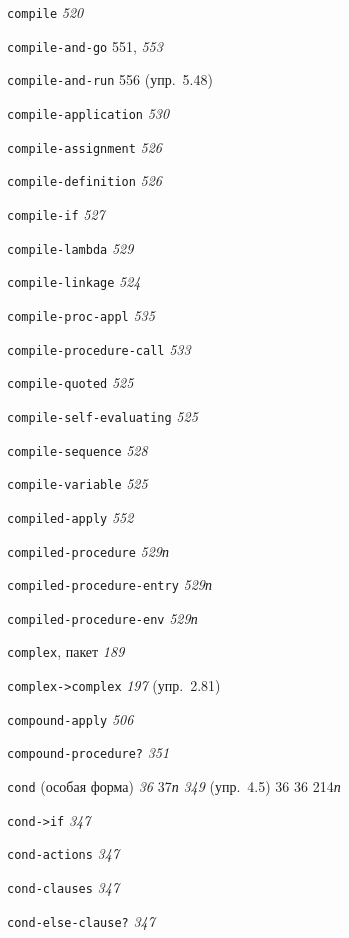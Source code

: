 \begin{theindex}
\item {\texttt{compile}} {\it 520}
\item {\texttt{compile-and-go}} 551, {\it 553}
\item {\texttt{compile-and-run}} 556 (упр.~5.48)
\item {\texttt{compile-application}} {\it 530}
\item {\texttt{compile-assignment}} {\it 526}
\item {\texttt{compile-definition}} {\it 526}
\item {\texttt{compile-if}} {\it 527}
\item {\texttt{compile-lambda}} {\it 529}
\item {\texttt{compile-linkage}} {\it 524}
\item {\texttt{compile-proc-appl}} {\it 535}
\item {\texttt{compile-procedure-call}} {\it 533}
\item {\texttt{compile-quoted}} {\it 525}
\item {\texttt{compile-self-evaluating}} {\it 525}
\item {\texttt{compile-sequence}} {\it 528}
\item {\texttt{compile-variable}} {\it 525}
\item {\texttt{compiled-apply}} {\it 552}
\item {\texttt{compiled-procedure}} {\it 529}{\it п}
\item {\texttt{compiled-procedure-entry}} {\it 529}{\it п}
\item {\texttt{compiled-procedure-env}} {\it 529}{\it п}
\item {\texttt{complex}, пакет} {\it 189}
\item {\texttt{complex->complex}} {\it 197} (упр.~2.81)
\item {\texttt{compound-apply}} {\it 506}
\item {\texttt{compound-procedure?}} {\it 351}
\item {\texttt{cond} (особая форма)} {\it 36}
   37{\it п}
   {\it 349} (упр.~4.5)
   36
   36
   214{\it п}
\item {\texttt{cond->if}} {\it 347}
\item {\texttt{cond-actions}} {\it 347}
\item {\texttt{cond-clauses}} {\it 347}
\item {\texttt{cond-else-clause?}} {\it 347}

\end{theindex}
